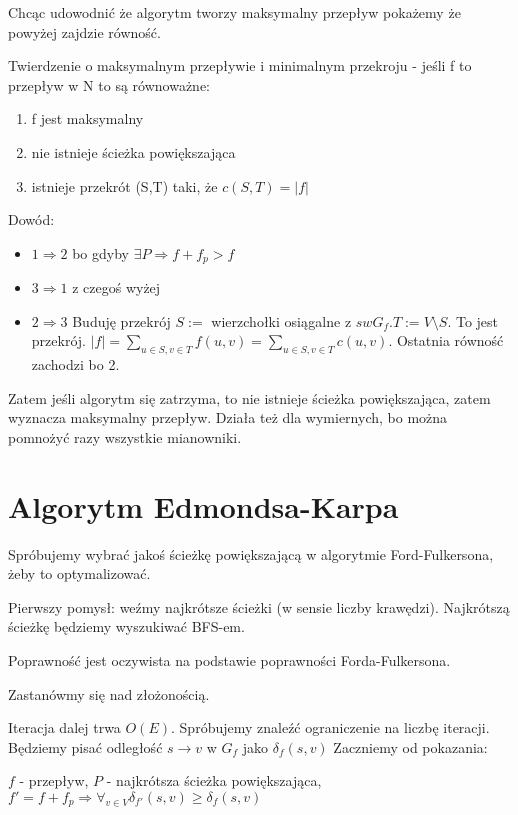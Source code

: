 Chcąc udowodnić że algorytm tworzy maksymalny przepływ pokażemy że powyżej zajdzie równość.

Twierdzenie o maksymalnym przepływie i minimalnym przekroju - jeśli f to przepływ w N to są równoważne:
\begin{enumerate}
    \item f jest maksymalny
    \item nie istnieje ścieżka powiększająca
    \item istnieje przekrót (S,T) taki, że $ c(S,T) = |f|$
    
\end{enumerate}

Dowód:
\begin{itemize}
\item $1 \Rightarrow 2$ bo gdyby $ \exists P \Rightarrow f + f_p > f$
\item $3 \Rightarrow 1$ z czegoś wyżej
\item $2 \Rightarrow 3$ Buduję przekrój $ S:= $ wierzchołki osiągalne z $s w G_f. T:= V \setminus S$. To jest przekrój. $|f| = \sum_{u \in S, v \in T} f(u,v) = \sum_{u \in S, v \in T} c(u,v)$. Ostatnia równość zachodzi bo 2. 
\end{itemize}

Zatem jeśli algorytm się zatrzyma, to nie istnieje ścieżka powiększająca, zatem wyznacza maksymalny przepływ. Działa też dla wymiernych, bo można pomnożyć razy wszystkie mianowniki.

\section{Algorytm Edmondsa-Karpa}

Spróbujemy wybrać jakoś ścieżkę powiększającą w algorytmie Ford-Fulkersona, żeby to optymalizować.

Pierwszy pomysł: weźmy najkrótsze ścieżki (w sensie liczby krawędzi). Najkrótszą ścieżkę będziemy wyszukiwać BFS-em.

Poprawność jest oczywista na podstawie poprawności Forda-Fulkersona.

Zastanówmy się nad złożonością.

Iteracja dalej trwa $O(E)$.
Spróbujemy znaleźć ograniczenie na liczbę iteracji.
Będziemy pisać odległość $s \rightarrow v$ w $G_{f}$ jako $\delta_{f}(s,v)$
Zaczniemy od pokazania:

\begin{lemat}
    $f$ - przepływ, $P$ - najkrótsza ścieżka powiększająca, $f' = f + f_p \Rightarrow \forall_{v \in V} \delta_{f'}(s,v) \ge \delta_{f}(s,v)$
\end{lemat}

